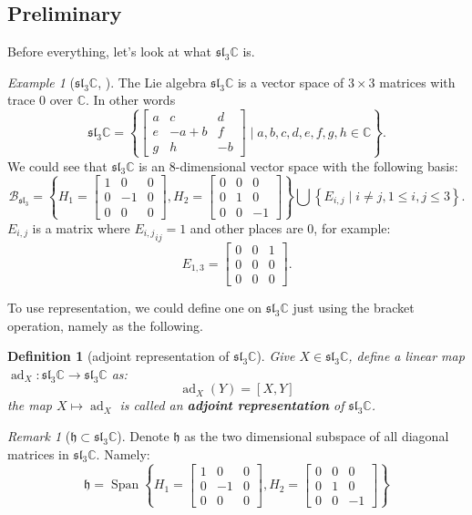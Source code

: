 \documentclass[a4paper]{article}
\newcommand{\C}{\mathbb{C}}
\theoremstyle{bfnote} %
\theoremstyle{bfnote}                  %
\newtheorem{defn}[thm]{Definition}
\theoremstyle{example}                       %
\theoremstyle{remark}                       %
\newtheorem{exmp}[thm]{Example}  %
\newtheorem{rem}[thm]{Remark}
\numberwithin{equation}{section}
\begin{document}
\subsection{Preliminary}
Before everything, let's look at what  $\mathfrak{sl}_3\C$ is.
\bigskip
\begin{exmp}[$\mathfrak{sl}_3\C$, \cite{hall}]\label{exmp:sl3}
	The Lie algebra $\mathfrak{sl}_3\C$ is a vector space of  $3 \times 3$ matrices with trace  $0$ over  $\C$. In other words \[
		\mathfrak{sl}_{3}\C = \left\{ \begin{bmatrix} a & c & d \\
		e & -a+b & f \\ g & h & -b\end{bmatrix} \mid a,b,c,d,e,f,g,h \in \C \right\} 
	.\]
	We could see that $\mathfrak{sl}_3\C$ is an  $8$-dimensional vector space with the following basis: \[
	\mathcal{B}_{\mathfrak{sl}_{3}} = \left\{ H_1 = \begin{bmatrix} 1 & 0 &0 \\ 0 & -1 & 0 \\ 0 &0 &0 \end{bmatrix}, H_2 = \begin{bmatrix} 0 &0 &0 \\ 0 &1&0 \\ 0&0&-1 \end{bmatrix}   \right\} \bigcup \left\{ E_{i,j} \mid i \neq j, 1\le i,j \le 3\right\}. 
\] $E_{i,j}$ is a matrix where ${E_{i,j}}_{ij} = 1$ and other places are $0$, for example:\[
		E_{1,3} = \begin{bmatrix} 0 & 0 & 1 \\ 0 & 0 &0 \\ 0 &0 &0 \end{bmatrix}. 
	\] 
\end{exmp}

To use representation, we could define one on $\mathfrak{sl}_3\C$ just using the bracket operation, namely as     the following.
\begin{defn}[adjoint representation of $\mathfrak{sl}_3\C$]\label{adjoint}
	Give $X \in \mathfrak{sl}_3\C$, define a linear map $\operatorname{ad}_X : \mathfrak{sl}_3\C \to \mathfrak{sl}_3\C$ as: \[
		\operatorname{ad}_X(Y) = [X,Y]
	\] the map $X \mapsto \operatorname{ad}_X$ is called an \textbf{adjoint representation} of $\mathfrak{sl}_3\C$.
\end{defn}
\begin{rem}[$\mathfrak{h} \subset \mathfrak{sl}_{3}\C$]
	Denote $\mathfrak{h}$ as the two dimensional subspace of all diagonal matrices in  $\mathfrak{sl}_3\C$. Namely:  \[
		\mathfrak{h} = \operatorname{Span}\left\{ H_1=\begin{bmatrix} 1 & 0 &0 \\ 0 & -1 & 0 \\ 0 &0 &0 \end{bmatrix}, H_2 = \begin{bmatrix} 0 &0 &0 \\ 0 &1&0\\0&0&-1 \end{bmatrix}   \right\} 
	\] 
\end{rem}
\end{document}
